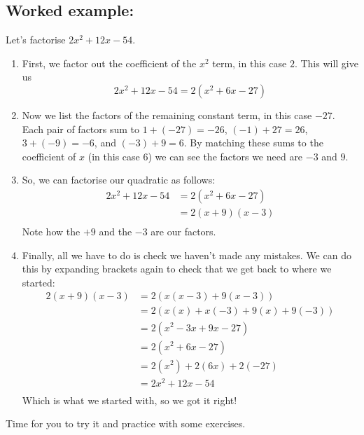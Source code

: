 \documentclass[12pt]{article}
\begin{document}
\subsection*{Worked example:} 
Let's factorise $2x^2 + 12x - 54$.
\begin{enumerate}
  \item First, we factor out the coefficient of the $x^2$ term, in this case $2$. This will give us 
    \begin{equation*}
      2x^2 + 12x - 54 = 2(x^2 + 6x - 27)
    \end{equation*}

  \item Now we list the factors of the remaining constant term, in this case $-27$. Each pair of factors sum to $1 + (-27) = -26$, $(-1) + 27 = 26$, $3 + (-9) = -6$, and $(-3) + 9 = 6$. By matching these sums to the coefficient of $x$ (in this case $6$) we can see the factors we need are $-3$ and $9$. 
  
  \item So, we can factorise our quadratic as follows:
    \begin{align*}
      2x^2 + 12x - 54 &= 2(x^2 + 6x - 27) \\
                      &= 2(x+9)(x-3) \\
    \end{align*}
    Note how the $+9$ and the $-3$ are our factors.

  \item Finally, all we have to do is check we haven't made any mistakes. We can do this by expanding brackets again to check that we get back to where we started:
    \begin{align*}
      2(x+9)(x-3) &= 2(x(x-3) + 9(x-3)) \\
                  &= 2(x(x) + x(-3) + 9(x) + 9(-3)) \\
                  &= 2(x^2 - 3x + 9x -27) \\
                  &= 2(x^2 + 6x - 27) \\
                  &= 2(x^2) + 2(6x) + 2(-27) \\
                  &= 2x^2 + 12x -54 \\
    \end{align*}
  Which is what we started with, so we got it right! 
\end{enumerate}

Time for you to try it and practice with some exercises.

\pagebreak
\end{document}
